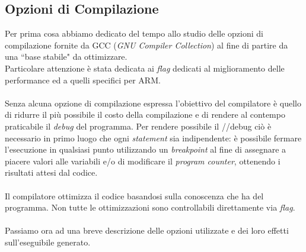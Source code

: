 \subsection{Opzioni di Compilazione}
Per prima cosa abbiamo dedicato del tempo allo studio delle opzioni di 
compilazione fornite da GCC (\emph{GNU Compiler Collection}) al fine di partire 
da una ``base stabile" da ottimizzare.\\
Particolare attenzione è stata dedicata ai \emph{flag} dedicati al 
miglioramento delle performance ed a quelli specifici per ARM.\\
\\
Senza alcuna opzione di compilazione espressa l'obiettivo del compilatore è 
quello di ridurre il più possibile il costo della compilazione e di rendere al 
contempo praticabile il \emph{debug} del programma. Per rendere possibile il 
//debug ciò è necessario in primo luogo che ogni \emph{statement} sia 
indipendente: è possibile fermare l'esecuzione in qualsiasi punto utilizzando 
un \emph{breakpoint} al fine di assegnare a piacere valori alle variabili e/o 
di modificare il \emph{program counter}, ottenendo i risultati attesi dal 
codice.\\
\\
Il compilatore ottimizza il codice basandosi sulla conoscenza che ha del 
programma. Non tutte le ottimizzazioni sono controllabili direttamente via 
\emph{flag}.\\
\\
Passiamo ora ad una breve descrizione delle opzioni utilizzate e dei loro 
effetti sull'eseguibile generato.

